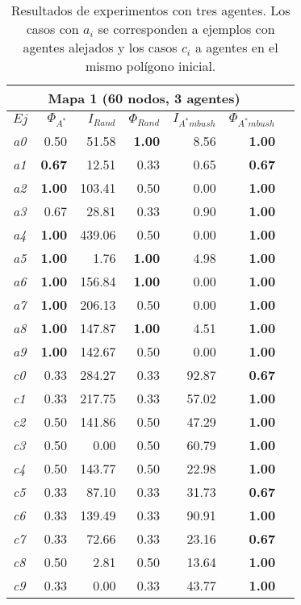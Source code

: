\begin{table}[htb]
\begin{center}
\begin{tabular}{|l|r|r|r|r|r|r|}
\hline
\multicolumn{6}{|c|}{\textbf{Mapa 1 (60 nodos, 3 agentes)}}\\
\hline
$Ej$ & $\Phi_{A^*}$ & $I_{Rand}$ & $\Phi_{Rand}$
& $I_{A^*mbush}$ & $\Phi_{A^*mbush}$\\
\hline
\textit{a0} & 0.50 & 51.58 & \textbf{1.00} & 8.56 & \textbf{1.00} \\
\textit{a1} & \textbf{0.67} & 12.51 & 0.33 & 0.65 & \textbf{0.67} \\
\textit{a2} & \textbf{1.00} & 103.41 & 0.50 & 0.00 & \textbf{1.00} \\
\textit{a3} & 0.67 & 28.81 & 0.33 & 0.90 & \textbf{1.00} \\
\textit{a4} & \textbf{1.00} & 439.06 & 0.50 & 0.00 & \textbf{1.00} \\
\textit{a5} & \textbf{1.00} & 1.76 & \textbf{1.00} & 4.98 & \textbf{1.00} \\
\textit{a6} & \textbf{1.00} & 156.84 & \textbf{1.00} & 0.00 & \textbf{1.00} \\
\textit{a7} & \textbf{1.00} & 206.13 & 0.50 & 0.00 & \textbf{1.00} \\
\textit{a8} & \textbf{1.00} & 147.87 & \textbf{1.00} & 4.51 & \textbf{1.00} \\
\textit{a9} & \textbf{1.00} & 142.67 & 0.50 & 0.00 & \textbf{1.00} \\
\hline
\hline
\textit{c0} & 0.33 & 284.27 & 0.33 & 92.87 & \textbf{0.67} \\
\textit{c1} & 0.33 & 217.75 & 0.33 & 57.02 & \textbf{1.00} \\
\textit{c2} & 0.50 & 141.86 & 0.50 & 47.29 & \textbf{1.00} \\
\textit{c3} & 0.50 & 0.00 & 0.50 & 60.79 & \textbf{1.00} \\
\textit{c4} & 0.50 & 143.77 & 0.50 & 22.98 & \textbf{1.00} \\
\textit{c5} & 0.33 & 87.10 & 0.33 & 31.73 & \textbf{0.67} \\
\textit{c6} & 0.33 & 139.49 & 0.33 & 90.91 & \textbf{1.00} \\
\textit{c7} & 0.33 & 72.66 & 0.33 & 23.16 & \textbf{0.67} \\
\textit{c8} & 0.50 & 2.81 & 0.50 & 13.64 & \textbf{1.00} \\
\textit{c9} & 0.33 & 0.00 & 0.33 & 43.77 & \textbf{1.00} \\
\hline
\end{tabular}
\end{center}
	\caption{\label{tab:exp1}
	     Resultados de experimentos con tres agentes. Los casos
	     con $a_i$ se corresponden a ejemplos con agentes alejados
	     y los casos $c_i$ a agentes en el mismo polígono inicial.}
\end{table}